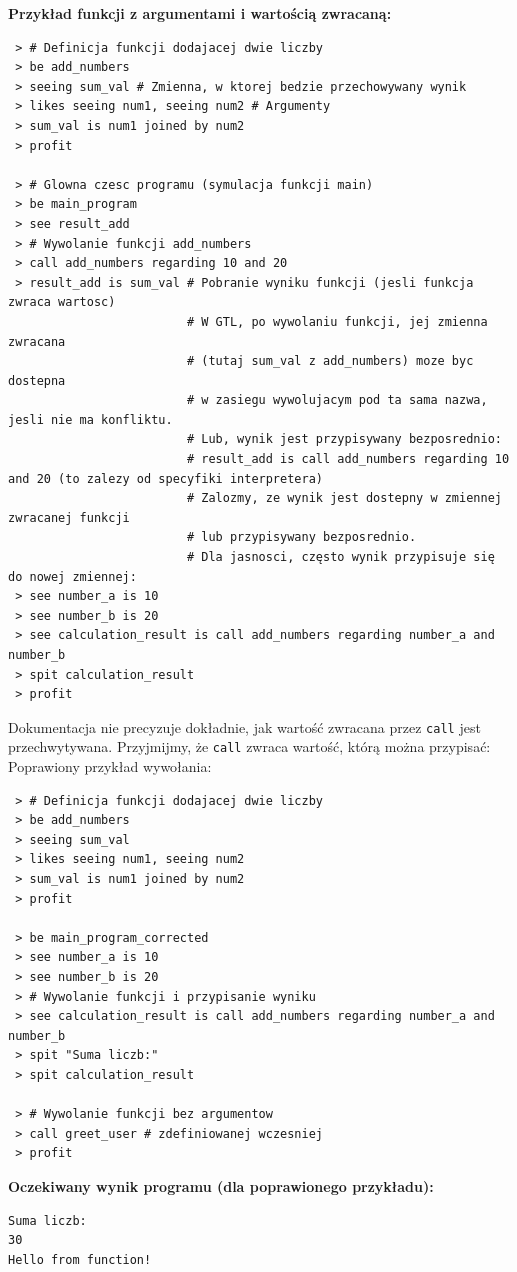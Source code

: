 \documentclass[12pt,a4paper]{article}
\begin{document}
\textbf{Przykład funkcji z argumentami i wartością zwracaną:}
\begin{lstlisting}
 > # Definicja funkcji dodajacej dwie liczby
 > be add_numbers
 > seeing sum_val # Zmienna, w ktorej bedzie przechowywany wynik
 > likes seeing num1, seeing num2 # Argumenty
 > sum_val is num1 joined by num2
 > profit

 > # Glowna czesc programu (symulacja funkcji main)
 > be main_program
 > see result_add
 > # Wywolanie funkcji add_numbers
 > call add_numbers regarding 10 and 20
 > result_add is sum_val # Pobranie wyniku funkcji (jesli funkcja zwraca wartosc)
                         # W GTL, po wywolaniu funkcji, jej zmienna zwracana
                         # (tutaj sum_val z add_numbers) moze byc dostepna
                         # w zasiegu wywolujacym pod ta sama nazwa, jesli nie ma konfliktu.
                         # Lub, wynik jest przypisywany bezposrednio:
                         # result_add is call add_numbers regarding 10 and 20 (to zalezy od specyfiki interpretera)
                         # Zalozmy, ze wynik jest dostepny w zmiennej zwracanej funkcji
                         # lub przypisywany bezposrednio.
                         # Dla jasnosci, często wynik przypisuje się do nowej zmiennej:
 > see number_a is 10
 > see number_b is 20
 > see calculation_result is call add_numbers regarding number_a and number_b
 > spit calculation_result
 > profit
\end{lstlisting}
Dokumentacja nie precyzuje dokładnie, jak wartość zwracana przez \texttt{call} jest przechwytywana. Przyjmijmy, że \texttt{call} zwraca wartość, którą można przypisać:
Poprawiony przykład wywołania:
\begin{lstlisting}
 > # Definicja funkcji dodajacej dwie liczby
 > be add_numbers
 > seeing sum_val
 > likes seeing num1, seeing num2
 > sum_val is num1 joined by num2
 > profit

 > be main_program_corrected
 > see number_a is 10
 > see number_b is 20
 > # Wywolanie funkcji i przypisanie wyniku
 > see calculation_result is call add_numbers regarding number_a and number_b
 > spit "Suma liczb:"
 > spit calculation_result

 > # Wywolanie funkcji bez argumentow
 > call greet_user # zdefiniowanej wczesniej
 > profit
\end{lstlisting}
\textbf{Oczekiwany wynik programu (dla poprawionego przykładu):}
\begin{verbatim}
Suma liczb:
30
Hello from function!
\end{verbatim}
\end{document}
